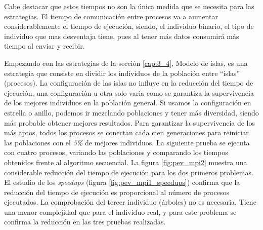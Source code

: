 		
		
		
		Cabe destacar que estos tiempos no son la única medida que se necesita para las estrategias. El tiempo de comunicación entre procesos va a aumentar considerablemente el tiempo de ejecución, siendo, el individuo binario, el tipo de individuo que mas desventaja tiene, pues al tener más datos consumirá más tiempo al enviar y recibir.
		




		Empezando con las estrategias de la sección \ref{cap:3_4}, Modelo de islas, es una estrategia que consiste en dividir los individuos de la población entre ``islas'' (procesos). La configuración de las islas no influye en la reducción del tiempo de ejecución, una configuración u otra solo varia como se garantiza la supervivencia de los mejores individuos en la población general. Si usamos la configuración en estrella o anillo, podemos ir mezclando poblaciones y tener más diversidad, siendo más probable obtener mejores resultados. Para garantizar la supervivencia de los más aptos, todos los procesos se conectan cada cien generaciones para reiniciar las poblaciones con el \textit{5\%} de mejores individuos. La siguiente prueba se ejecuta con cuatro procesos, variando las poblaciones y comparando los tiempos obtenidos frente al algoritmo secuencial. La figura \ref{fig:pev_mpi2} muestra una considerable reducción del tiempo de ejecución para los dos primeros problemas. El estudio de los \textit{speedups} (figura \ref{fig:pev_mpi1_speedups}) confirma que la reducción del tiempo de ejecución es proporcional al número de procesos ejecutados. La comprobación del tercer individuo (árboles) no es necesaria. Tiene una menor complejidad que para el individuo real, y para este problema se confirma la reducción en las tres pruebas realizadas.
		
			
		
